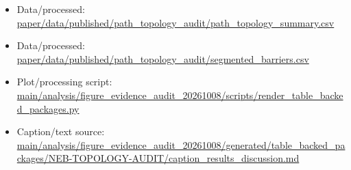 \begin{itemize}[leftmargin=1.4em,noitemsep]
\item Data/processed: \begingroup\scriptsize\url{paper/data/published/path_topology_audit/path_topology_summary.csv}\endgroup
\item Data/processed: \begingroup\scriptsize\url{paper/data/published/path_topology_audit/segmented_barriers.csv}\endgroup
\item Plot/processing script: \begingroup\scriptsize\url{main/analysis/figure_evidence_audit_20261008/scripts/render_table_backed_packages.py}\endgroup
\item Caption/text source: \begingroup\scriptsize\url{main/analysis/figure_evidence_audit_20261008/generated/table_backed_packages/NEB-TOPOLOGY-AUDIT/caption_results_discussion.md}\endgroup
\end{itemize}
